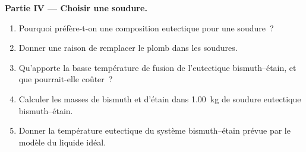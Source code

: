 \begin{problem}
\medskip
\noindent\textbf{Partie IV --- Choisir une soudure.}
\begin{enumerate}[resume]
  \item Pourquoi préfère-t-on une composition eutectique pour une soudure~?
  \item Donner une raison de remplacer le plomb dans les soudures.
  \item Qu'apporte la basse température de fusion de l'eutectique bismuth--étain, et
        que pourrait-elle coûter~?
  \item Calculer les masses de bismuth et d'étain dans \qty{1.00}{kg} de soudure
        eutectique bismuth--étain.
  \item Donner la température eutectique du système bismuth--étain prévue par le modèle
        du liquide idéal.
\end{enumerate}
\end{problem}
